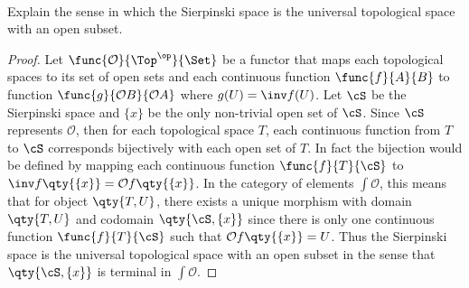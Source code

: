 \documentclass[main.tex]{subfiles}
\begin{document}
	
\paragraph{}

	\begin{exercise}
		
	Explain the sense in which the Sierpinski space is the universal topological
	space with an open subset.
		
	\end{exercise}
	
	
	\begin{proof}
		
		Let $\func{\mathcal{O}}{\Top^{\op} }{\Set}$ be a functor that
		maps each topological spaces to its set of open sets and each
		continuous function $\func{f}{A}{B}$ to function
		$\func{g}{\mathcal{O}B}{\mathcal{O}A}$ where $g(U) = \inv
		f(U)$. Let $\cS$ be the Sierpinski space and $\{x\}$ be the
		only non-trivial open set of $\cS$. Since $\cS$ represents
		$\mathcal{O}$, then for each topological space $T$, each
		continuous function from $T$ to $\cS$ corresponds bijectively
		with each open set of $T$. In fact the bijection would be
		defined by mapping each continuous function $\func{f}{T}{\cS}$
		to $\inv f\qty{\{x\}} = \mathcal{O}f\qty{\{x\}}$. In the
		category of elements $\int \mathcal{O} $, this means that for
		object $\qty{T,U}$, there exists a unique morphism with domain
		$\qty{T,U}$ and codomain $\qty{\cS, \{x\}}$ since there is only
		one continuous function $\func{f}{T}{\cS}$ such that
		$\mathcal{O}f\qty{\{x\}} = U$. Thus the Sierpinski space is the
		universal topological space with an open subset in the sense
		that $\qty{\cS,\{x\}}$ is terminal in $\int \mathcal{O} $.
	
		
	\end{proof}
\end{document}
